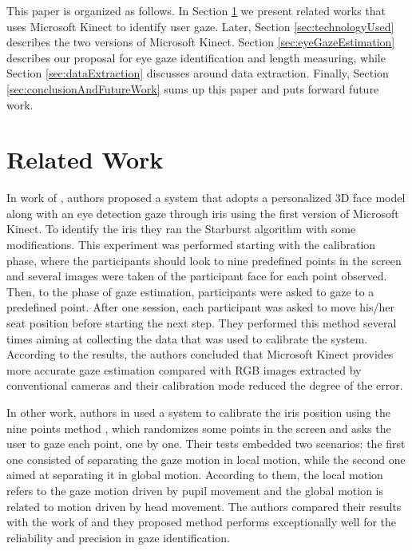 \documentclass[10pt, conference]{IEEEtran}
\begin{document}
	This paper is organized as follows.
	In Section \ref{sec:relatedWork} we present related works that uses Microsoft Kinect to identify user gaze.
	Later, Section \ref{sec:technologyUsed} describes the two versions of Microsoft Kinect.
	Section \ref{sec:eyeGazeEstimation} describes our proposal for eye gaze identification and length measuring, while Section \ref{sec:dataExtraction} discusses around data extraction.
	Finally, Section \ref{sec:conclusionAndFutureWork} sums up this paper and puts forward future work.

\section{Related Work} \label{sec:relatedWork}

	In work of \cite{7}, authors proposed a system that adopts a personalized 3D face model along with an eye detection gaze through iris using the first version of Microsoft Kinect. 
	To identify the iris they ran the Starburst algorithm \cite{8} with some modifications. 
	This experiment was performed starting with the calibration phase, where the participants should look to nine predefined points in the screen and several images were taken of the participant face for each point observed. 
	Then, to the phase of gaze estimation, participants were asked to gaze to a predefined point. 
	After one session, each participant was asked to move his/her seat position before starting the next step. 
	They performed this method several times aiming at collecting the data that was used to calibrate the system.
	According to the results, the authors concluded that Microsoft Kinect provides more accurate gaze estimation compared with RGB images extracted by conventional cameras and their calibration mode reduced the degree of the error.

	In other work, authors in \cite{8} used a system to calibrate the iris position using the nine points method \cite{9}, which randomizes some points in the screen and asks the user to gaze each point, one by one. 
	Their tests embedded two scenarios: the first one consisted of separating the gaze motion in local motion, while the second one aimed at separating it in global motion. 
	According to them, the local motion refers to the gaze motion driven by pupil movement and the global motion is related to motion driven by head movement. 
	The authors compared their results with the work of \cite{9} and they proposed method performs exceptionally well for the reliability and precision in gaze identification.
\end{document}

